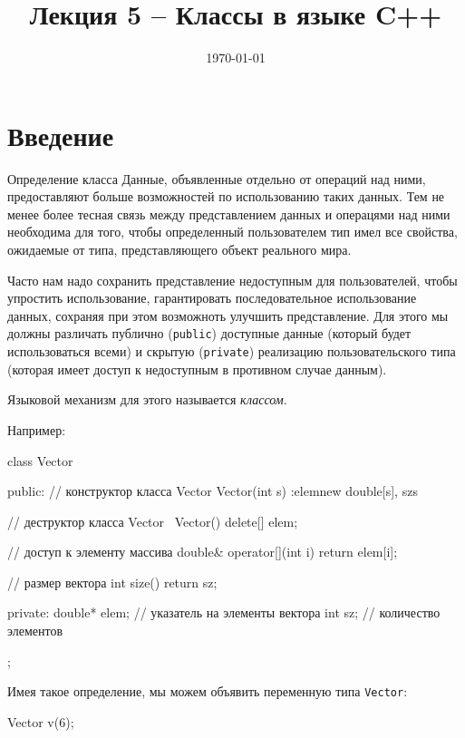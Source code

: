 \documentclass[
    9pt,
    hyperref={pdfencoding=unicode}
    ]{beamer}
\title{Лекция 5 – Классы в языке C++}
\institute{Кафедра прикладной математики и информатики}
\date{\today}
\theoremstyle{definition}
\begin{document}
\titlepage 
\section{Введение}

\begin{frame}[fragile]{Определение класса}
    Данные, объявленные отдельно от операций над ними, предоставляют больше возможностей по использованию таких данных. Тем не менее более тесная связь между представлением данных и
    операцями над ними необходима для того, чтобы определенный пользователем тип имел все свойства, ожидаемые от типа, представляющего объект реального мира.

    \vfill
    
    Часто нам надо сохранить представление недоступным для пользователей,
    чтобы упростить использование, гарантировать последовательное использование
    данных, сохраняя при этом возможноть улучшить представление. Для этого мы должны
    различать публично (\texttt{public}) доступные данные (который будет использоваться всеми) 
    и скрытую (\texttt{private}) реализацию пользовательского типа (которая
    имеет доступ к недоступным  в противном случае данным). 
    
    \vfill
    
    Языковой механизм для этого называется \emph{классом}.     
\end{frame}

\begin{frame}[fragile]
    
    Например:
    
    \begin{cppcode}
        class Vector {
          public:
            // конструктор класса Vector
            Vector(int s) :elem{new double[s]}, sz{s} { } 
            
            // деструктор класса Vector
            ~Vector(){ delete[] elem; }
            
            // доступ к элементу массива
            double& operator[](int i) { return elem[i]; } 
            
            // размер вектора
            int size() { return sz; }
            
          private:
            double* elem; // указатель на элементы вектора
            int sz; // количество элементов
        };
    \end{cppcode}    
      
         
     \vfill
      
    Имея такое определение, мы можем объявить переменную типа \texttt{Vector}:
    \begin{cppcode}
        Vector v(6);
    \end{cppcode}   
\end{frame}
\end{document}
